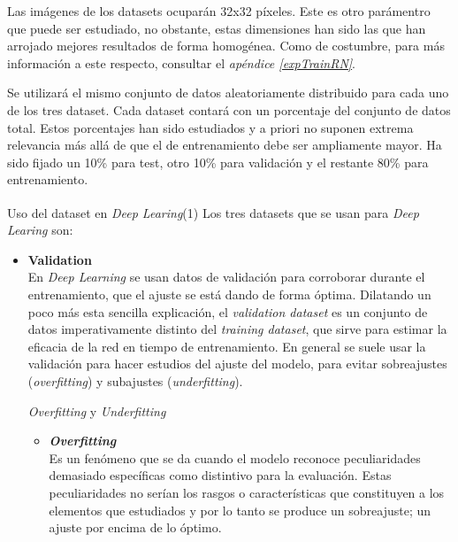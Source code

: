 Las imágenes de los datasets ocuparán 32x32 píxeles. Este es otro parámentro que puede
ser estudiado, no obstante, estas dimensiones han sido las que han arrojado mejores
resultados de forma homogénea. Como de costumbre, para más información a este respecto,
consultar el \textit{apéndice \ref{expTrainRN}}.

Se utilizará el mismo conjunto de datos aleatoriamente distribuido para cada
uno de los tres dataset. Cada dataset contará con un porcentaje del conjunto de datos
total. Estos porcentajes han sido estudiados y a priori no suponen extrema relevancia
más allá de que el de entrenamiento debe ser ampliamente mayor. Ha sido fijado un
10\% para test, otro 10\% para validación y el restante 80\% para entrenamiento.
\newpage
\begin{teoria}{Uso del dataset en \textit{Deep Learing}(1)\textsuperscript{\cite{Andreas}}}
    \color{mitexto}
    Los tres datasets que se usan para \textit{Deep Learing} son:
    \begin{itemize}
        \itemsep0em
        \item \textbf{Validation}\\
        {\small En \textit{Deep Learning} se usan datos de validación para corroborar
        durante el entrenamiento, que el ajuste se está dando de forma óptima.\newline
        Dilatando un poco más esta sencilla explicación, el \textit{validation dataset}
        es un conjunto de datos imperativamente distinto del \textit{training dataset},
        que sirve para estimar la eficacia de la red en tiempo de entrenamiento.\newline
        En general se suele usar la validación para hacer estudios del ajuste del modelo,
        para evitar sobreajustes (\textit{overfitting}) y subajustes (\textit{underfitting}).}
        \begin{teoria}{\textit{Overfitting} y \textit{Underfitting}\label{ovYun}}
            \color{mitexto}
            \begin{itemize}
                \item \textbf{\textit{Overfitting}}\\
                {\small Es un fenómeno que se da cuando el modelo reconoce peculiaridades
                demasiado específicas como distintivo para la evaluación. Estas
                peculiaridades no serían los rasgos o características que constituyen
                a los elementos que estudiados y por lo tanto se produce un
                sobreajuste; un ajuste por encima de lo óptimo.} 

\end{itemize}
\end{teoria}
\end{itemize}
\end{teoria}
